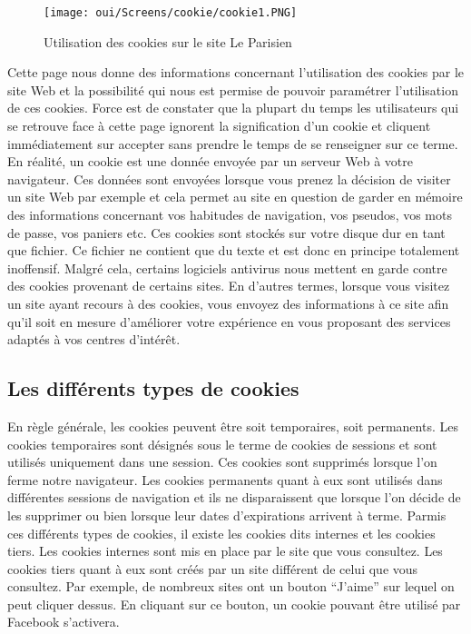 \begin{figure}[htp!]
  \centering
  \setlength\figureheight{7cm}
  \setlength\figurewidth{9cm}
  \texttt{[image: oui/Screens/cookie/cookie1.PNG]}
   \caption{Utilisation des cookies sur le site Le Parisien}
  \label{fig:courbe-tikz}
\end{figure}

Cette page nous donne des informations concernant l’utilisation des cookies par le site Web et la possibilité qui nous est permise de pouvoir paramétrer l’utilisation de ces cookies. Force est de constater que la plupart du temps les utilisateurs qui se retrouve face à cette page ignorent la signification d’un cookie et cliquent immédiatement sur accepter sans prendre le temps de se renseigner sur ce terme. En réalité, un cookie est une donnée envoyée par un serveur Web à votre navigateur. Ces données sont envoyées lorsque vous prenez la décision de visiter un site Web par exemple et cela permet au site en question de garder en mémoire des informations concernant vos habitudes de navigation, vos pseudos, vos mots de passe, vos paniers etc. Ces cookies sont stockés sur votre disque dur en tant que fichier. Ce fichier ne contient que du texte et est donc en principe totalement inoffensif. Malgré cela, certains logiciels antivirus nous mettent en garde contre des cookies provenant de certains sites. En d’autres termes, lorsque vous visitez un site ayant recours à des cookies, vous envoyez des informations à ce site afin qu’il soit en mesure d’améliorer votre expérience en vous proposant des services adaptés à vos centres d'intérêt. 

\subsection{Les différents types de cookies}

En règle générale, les cookies peuvent être soit temporaires, soit permanents. Les cookies temporaires sont désignés sous le terme de cookies de sessions et sont utilisés uniquement dans une session. Ces cookies sont supprimés lorsque l’on ferme notre navigateur. Les cookies permanents quant à eux sont utilisés dans différentes sessions de navigation et ils ne disparaissent que lorsque l’on décide de les supprimer ou bien lorsque leur dates d’expirations arrivent à terme. Parmis ces différents types de cookies, il existe les cookies dits internes et les cookies tiers. Les cookies internes sont mis en place par le site que vous consultez. Les cookies tiers quant à eux sont créés par un site différent de celui que vous consultez. Par exemple, de nombreux sites ont un bouton “J’aime” sur lequel on peut cliquer dessus. En cliquant sur ce bouton, un cookie pouvant être utilisé par Facebook s’activera.

